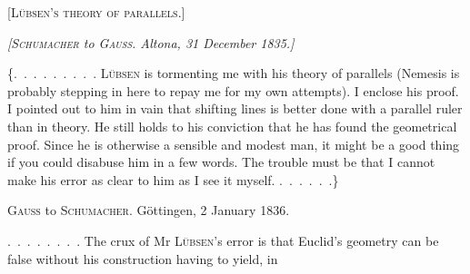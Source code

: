 \clearpage
{}%
\begin{center}
\Large\textsc{[Lübsen's theory of parallels.]}
\end{center}


\begin{center}
\emph{[\textup{\textsc{Schumacher}} to \textup{\textsc{Gauss}}. Altona, 31 December 1835.]}
\end{center}

\{\mbox{.\ .\ .\ .\ .\ .\ .\ .\ .} \textsc{Lübsen} is tormenting me with his theory of parallels
(Nemesis is probably stepping in here to repay me for my own
attempts). I enclose his proof. I pointed out to him
in vain that shifting lines is better done with a
parallel ruler than in theory. He still holds to his
conviction that he has found the geometrical proof.
Since he is otherwise a sensible and
modest man, it might be a good thing if you could disabuse him
in a few words. The trouble must be that I cannot make
his error as clear to him as I see it
myself. \mbox{.\ .\ .\ .\ .\ .}\}


\begin{center}
\textsc{Gauss} to \textsc{Schumacher}. Göttingen, 2 January 1836.
\end{center}

\mbox{.\ .\ .\ .\ .\ .\ .\ .} The crux of Mr \textsc{Lübsen}'s error is that
Euclid's geometry can be false without his construction having to yield,
in
